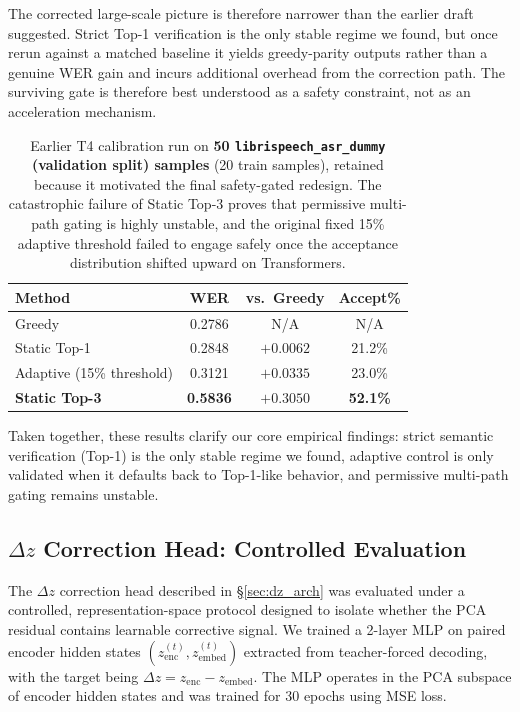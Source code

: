 \documentclass[11pt,a4paper]{article}
\begin{document}
The corrected large-scale picture is therefore narrower than the earlier draft suggested. Strict Top-1 verification is the only stable regime we found, but once rerun against a matched baseline it yields greedy-parity outputs rather than a genuine WER gain and incurs additional overhead from the correction path. The surviving gate is therefore best understood as a safety constraint, not as an acceleration mechanism.

\begin{table}[H]
\centering
\small
\begin{tabular}{@{}lccc@{}}
\toprule
\textbf{Method} & \textbf{WER} & \textbf{vs.\ Greedy} & \textbf{Accept\%} \\
\midrule
Greedy & 0.2786 & N/A & N/A \\
Static Top-1 & 0.2848 & $+0.0062$ & 21.2\% \\
Adaptive (15\% threshold) & 0.3121 & $+0.0335$ & 23.0\% \\
\textbf{Static Top-3} & \textbf{0.5836} & $\mathbf{+0.3050}$ & \textbf{52.1\%} \\
\bottomrule
\end{tabular}
\caption{Earlier T4 calibration run on \textbf{50 \texttt{librispeech\_asr\_dummy} (validation split) samples} (20 train samples), retained because it motivated the final safety-gated redesign. The catastrophic failure of Static Top-3 proves that permissive multi-path gating is highly unstable, and the original fixed 15\% adaptive threshold failed to engage safely once the acceptance distribution shifted upward on Transformers.}
\label{tab:t4_50}
\end{table}

Taken together, these results clarify our core empirical findings: strict semantic verification (Top-1) is the only stable regime we found, adaptive control is only validated when it defaults back to Top-1-like behavior, and permissive multi-path gating remains unstable.

\subsection{$\Delta z$ Correction Head: Controlled Evaluation}
\label{sec:correction_eval}

The $\Delta z$ correction head described in \S\ref{sec:dz_arch} was evaluated under a controlled, representation-space protocol designed to isolate whether the PCA residual contains learnable corrective signal.
We trained a 2-layer MLP on paired encoder hidden states $(z_{\text{enc}}^{(t)}, z_{\text{embed}}^{(t)})$ extracted from teacher-forced decoding, with the target being $\Delta z = z_{\text{enc}} - z_{\text{embed}}$.
The MLP operates in the PCA subspace of encoder hidden states and was trained for 30 epochs using MSE loss.
\end{document}
